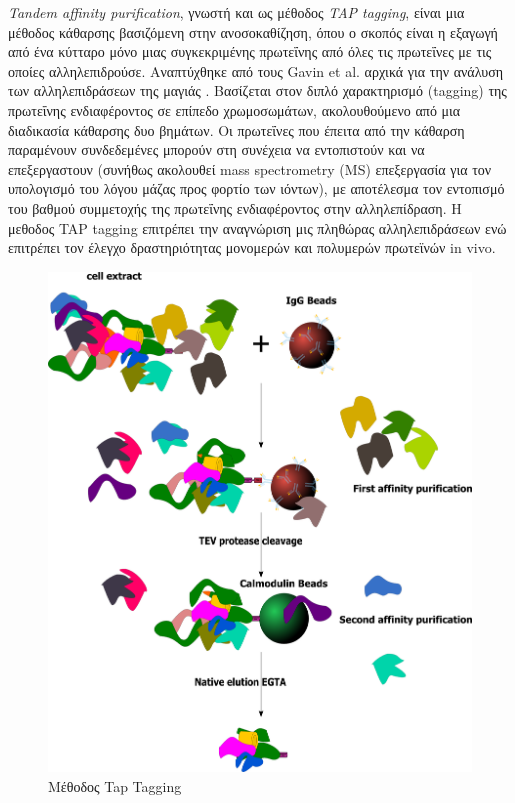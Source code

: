 \medskip
\textit{Tandem affinity purification}, γνωστή και ως μέθοδος \textit{TAP tagging}, είναι μια μέθοδος κάθαρσης βασιζόμενη στην ανοσοκαθίζηση, όπου ο σκοπός είναι η εξαγωγή από ένα κύτταρο μόνο μιας συγκεκριμένης πρωτεΐνης από όλες τις πρωτεΐνες με τις οποίες αλληλεπιδρούσε. Αναπτύχθηκε από τους Gavin et al. αρχικά για την ανάλυση των αλληλεπιδράσεων της μαγιάς \cite{Gavin2002}. Βασίζεται στον διπλό χαρακτηρισμό (tagging) της πρωτεΐνης ενδιαφέροντος σε επίπεδο χρωμοσωμάτων, ακολουθούμενο από μια διαδικασία κάθαρσης δυο βημάτων. Οι πρωτεΐνες που έπειτα από την κάθαρση παραμένουν συνδεδεμένες μπορούν στη συνέχεια να εντοπιστούν και να επεξεργαστουν (συνήθως ακολουθεί mass spectrometry (MS) επεξεργασία για τον υπολογισμό του λόγου μάζας προς φορτίο των ιόντων), με αποτέλεσμα τον εντοπισμό του βαθμού συμμετοχής της πρωτεΐνης ενδιαφέροντος στην αλληλεπίδραση. Η μεθοδος TAP tagging επιτρέπει την αναγνώριση μις πληθώρας αλληλεπιδράσεων ενώ επιτρέπει τον έλεγχο δραστηριότητας μονομερών και πολυμερών πρωτεϊνών in vivo.

\begin{figure}[h]
  \centering
  \includegraphics[scale=0.20]{images/Taptag_simple.png}
  \caption{Μέθοδος Tap Tagging}
  \label{fig:Taptag_simple}
\end{figure}

